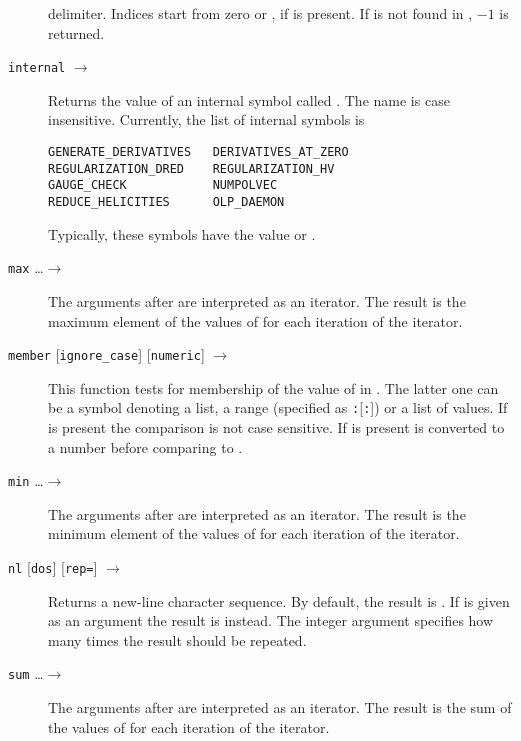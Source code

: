 \documentclass[11pt,a4paper]{refrep}
\begin{document}
\begin{description}
   delimiter. Indices start from zero or , if  is
   present. If  is not found in , $-1$ is
   returned.
\item[\texttt{internal} \synt{name} $\to$ \synt{string}]
   Returns the value of an internal symbol called .
   The name is case insensitive. Currently, the list of internal symbols
   is
\begin{verbatim}
GENERATE_DERIVATIVES   DERIVATIVES_AT_ZERO
REGULARIZATION_DRED    REGULARIZATION_HV
GAUGE_CHECK            NUMPOLVEC
REDUCE_HELICITIES      OLP_DAEMON
\end{verbatim}
   Typically, these symbols have the value  or .
\item[\texttt{max} \synt{var} \ldots $\to$ \synt{string}] The arguments
   after  are interpreted as an iterator. The result is the
   maximum element
   of the values of  for each iteration of the iterator.
\item[\texttt{member} \synt{needle} \synt{haystack} {[\texttt{ignore\_case}]}
{[\texttt{numeric}]} $\to$ \synt{logical}]
   This function tests for membership of the value of 
   in . The latter one can be a symbol denoting a list,
   a range (specified as \texttt{:}[\texttt{:}])
   or a list of values. If  is present the comparison
   is not case sensitive. If  is present 
   is converted to a number before comparing to .
\item[\texttt{min} \synt{var} \ldots $\to$ \synt{string}] The arguments
   after  are interpreted as an iterator. The result is the
   minimum element
   of the values of  for each iteration of the iterator.
\item[\texttt{nl} {[\texttt{dos}]} {[\texttt{rep=}\synt{factor}]}
   $\to$ \synt{string}]
   Returns a new-line character sequence. By default, the result
   is \lit{\\n}. If  is given as an argument the result is
   \lit{\\r\\n} instead. The integer argument  specifies
   how many times the result should be repeated.
\item[\texttt{sum} \synt{var} \ldots $\to$ \synt{integer}] The arguments
   after  are interpreted as an iterator. The result is the
   sum of the values of  for each iteration of the iterator.

\end{description}
\end{document}
